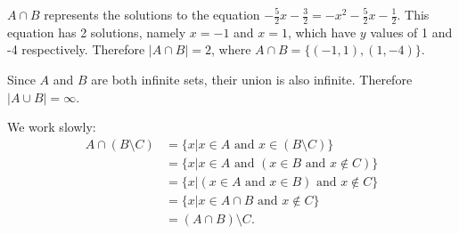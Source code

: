 \begin{questions}
    \begin{partquestions}{\alph*}
        \item $A \cap B$ represents the solutions to the equation $-\frac52x-\frac32 = -x^2-\frac52x-\frac12$. This equation has 2 solutions, namely $x = -1$ and $x = 1$, which have $y$ values of 1 and -4 respectively. Therefore $|A \cap B| = 2$, where $A \cap B = \{(-1, 1), (1, -4)\}$.
        \item Since $A$ and $B$ are both infinite sets, their union is also infinite. Therefore $|A \cup B| = \infty$.
    \end{partquestions}

    \item We work slowly:
    \begin{align*}
        A \cap (B \setminus C) &= \{x \vert x \in A \text{ and } x \in (B \setminus C)\}\\
        &= \{x \vert x \in A \text{ and } (x \in B \text{ and } x \notin C)\}\\
        &= \{x \vert (x \in A \text{ and } x \in B) \text{ and } x \notin C\}\\
        &= \{x \vert x \in A \cap B \text{ and } x \notin C\}\\
        &= (A \cap B) \setminus C.
    \end{align*}
\end{questions}
